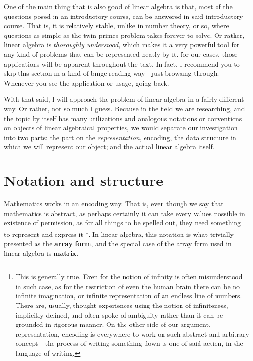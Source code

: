 One of the main thing that is also good of linear algebra is that, most of the questions posed in an introductory course, can be answered in said introductory course. That is, it is relatively stable, unlike in number theory, or so, where questions as simple as the twin primes problem takes forever to solve. Or rather, linear algebra is \textit{thoroughly understood}, which makes it a very powerful tool for any kind of problems that can be represented neatly by it. for our cases, those applications will be apparent throughout the text. In fact, I recommend you to skip this section in a kind of binge-reading way - just browsing through. Whenever you see the application or usage, going back. 

With that said, I will approach the problem of linear algebra in a fairly different way. Or rather, not so much I guess. Because in the field we are researching, and the topic by itself has many utilizations and analogous notations or conventions on objects of linear algebraical properties, we would separate our investigation into two parts: the part on the \textit{representation}, encoding, the data structure in which we will represent our object; and the actual linear algebra itself. 
\section{Notation and structure}
Mathematics works in an encoding way. That is, even though we say that mathematics is abstract, as perhaps certainly it can take every values possible in existence of permission, as for all things to be spelled out, they need something to represent and express it \footnote{This is generally true. Even for the notion of infinity is often misunderstood in such case, as for the restriction of even the human brain there can be no infinite imagination, or infinite representation of an endless line of numbers. There are, usually, thought experiences using the notion of infiniteness, implicitly defined, and often spoke of ambiguity rather than it can be grounded in rigorous manner. On the other side of our argument, representation, encoding is everywhere to work on such abstract and arbitrary concept - the process of writing something down is one of said action, in the language of writing.}. In linear algebra, this notation is what trivially presented as the \textbf{array form}, and the special case of the array form used in linear algebra is \textbf{matrix}. 
